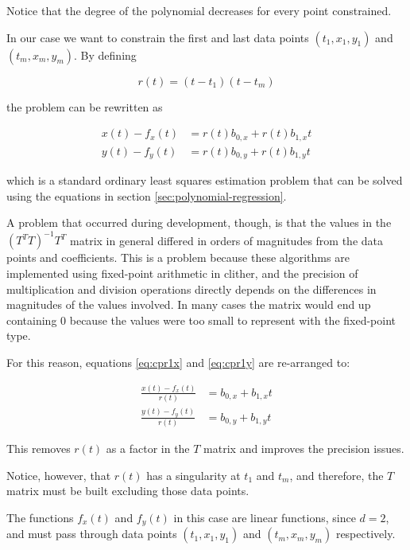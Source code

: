 Notice that the degree of the polynomial decreases for every point constrained.

In our case we want to constrain the first and last data points $(t_1,x_1,y_1)$
and $(t_m,x_m,y_m)$. By defining

\begin{equation}
    r(t) = (t-t_1)(t-t_m)
\end{equation}

the problem can be rewritten as

\begin{align}
    x(t) - f_x(t) &= r(t) b_{0,x} + r(t) b_{1,x} t \label{eq:cpr1x} \\
    y(t) - f_y(t) &= r(t) b_{0,y} + r(t) b_{1,y} t \label{eq:cpr1y}
\end{align}

which  is  a  standard  ordinary least squares estimation problem that  can  be
solved   using  the  equations  in   section   \ref{sec:polynomial-regression}.

A problem that  occurred  during development, though, is that the values in the
$(T^T T)^{-1} T^T$ matrix in general differed in orders  of magnitudes from the
data points  and  coefficients.  This is a problem because these algorithms are
implemented using fixed-point arithmetic  in  clither,  and  the  precision  of
multiplication  and  division operations directly depends on the differences in
magnitudes  of  the  values  involved. In many cases the matrix  would  end  up
containing  $0$  because  the values were  too  small  to  represent  with  the
fixed-point type.

For  this  reason,  equations \ref{eq:cpr1x} and \ref{eq:cpr1y} are re-arranged
to:

\begin{align}
    \frac{x(t) - f_x(t)}{r(t)} &= b_{0,x} + b_{1,x} t \\
    \frac{y(t) - f_y(t)}{r(t)} &= b_{0,y} + b_{1,y} t
\end{align}

This removes $r(t)$  as  a  factor in the $T$ matrix and improves the precision
issues.

Notice,  however,  that  $r(t)$  has  a  singularity  at  $t_1$ and $t_m$,  and
therefore,  the  $T$  matrix  must  be  built  excluding  those   data  points.

The functions $f_x(t)$ and $f_y(t)$ in  this  case  are linear functions, since
$d=2$,  and  must pass through data points $(t_1,x_1,y_1)$ and  $(t_m,x_m,y_m)$
respectively.

